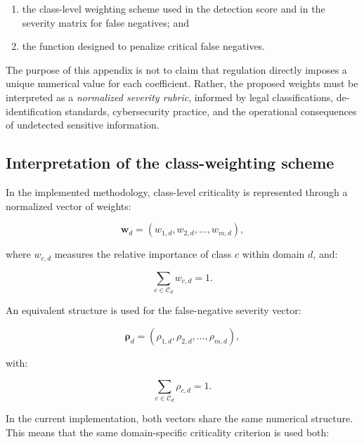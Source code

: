 \documentclass[11pt,a4paper]{article}
\begin{document}
\begin{enumerate}
    \item the class-level weighting scheme used in the detection score and in the severity matrix for false negatives; and
    \item the function designed to penalize critical false negatives.
\end{enumerate}

The purpose of this appendix is not to claim that regulation directly imposes a unique numerical value for each coefficient. Rather, the proposed weights must be interpreted as a \textit{normalized severity rubric}, informed by legal classifications, de-identification standards, cybersecurity practice, and the operational consequences of undetected sensitive information.

\subsection{Interpretation of the class-weighting scheme}

In the implemented methodology, class-level criticality is represented through a normalized vector of weights:

\begin{equation}
    \mathbf{w}_d =
    \left(
    w_{1,d}, w_{2,d}, \ldots, w_{m,d}
    \right),
\end{equation}

where \(w_{c,d}\) measures the relative importance of class \(c\) within domain \(d\), and:

\begin{equation}
    \sum_{c\in\mathcal{C}_d} w_{c,d}=1.
\end{equation}

An equivalent structure is used for the false-negative severity vector:

\begin{equation}
    \boldsymbol{\rho}_d =
    \left(
    \rho_{1,d}, \rho_{2,d}, \ldots, \rho_{m,d}
    \right),
\end{equation}

with:

\begin{equation}
    \sum_{c\in\mathcal{C}_d} \rho_{c,d}=1.
\end{equation}

In the current implementation, both vectors share the same numerical structure. This means that the same domain-specific criticality criterion is used both:
\end{document}
